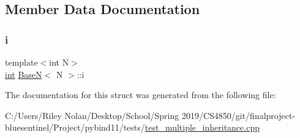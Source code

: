 \subsection{Member Data Documentation}
\mbox{\label{struct_base_n_a3f0cdb98541f97f6040ac1ecafcf30bb}} 
\subsubsection{\texorpdfstring{i}{i}}
{\footnotesize\ttfamily template$<$int N$>$ \\
\mbox{\hyperlink{warnings_8h_a74f207b5aa4ba51c3a2ad59b219a423b}{int}} \mbox{\hyperlink{struct_base_n}{BaseN}}$<$ N $>$\+::i}



The documentation for this struct was generated from the following file\+:\begin{DoxyCompactItemize}
\item 
C\+:/\+Users/\+Riley Nolan/\+Desktop/\+School/\+Spring 2019/\+C\+S4850/git/finalproject-\/bluesentinel/\+Project/pybind11/tests/\mbox{\hyperlink{test__multiple__inheritance_8cpp}{test\+\_\+multiple\+\_\+inheritance.\+cpp}}\end{DoxyCompactItemize}
